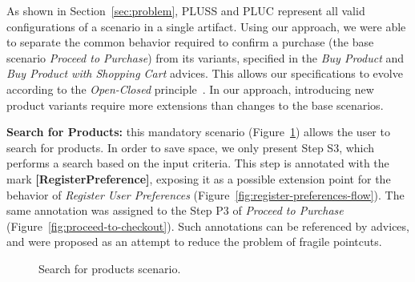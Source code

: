 As shown in Section~\ref{sec:problem}, PLUSS and PLUC represent all valid
configurations of a scenario in a single artifact. Using our approach, we were
able to separate the common behavior required to confirm a purchase (the base
scenario \emph{Proceed to Purchase}) from its variants, specified in the
\emph{Buy Product} and \emph{Buy Product with Shopping Cart} advices. This allows
our specifications to evolve according to the \emph{Open-Closed}
principle~\cite{Meyer:2000aa}. In our approach, introducing new product variants
require more extensions than changes to the base scenarios.

{\bf Search for
Products:} this mandatory scenario (Figure~\ref{fig:search-products-flow}) allows
the user to search for products. In order to save space, we only present Step S3,
which performs a search based on the input criteria. This step is annotated with
the mark \mbox{{\bf [RegisterPreference]}}, exposing it as a possible extension
point for the behavior of \emph{Register User Preferences}
(Figure~\ref{fig:register-preferences-flow}). The same annotation was assigned to
the Step P3 of \emph{Proceed to Purchase} (Figure~\ref{fig:proceed-to-checkout}).
Such annotations can be referenced by advices, and were proposed as an attempt to
reduce the problem of fragile pointcuts.

%

\begin{figure}[ht]
\caption{Search for products scenario.}
\label{fig:search-products-flow}
\end{figure}

